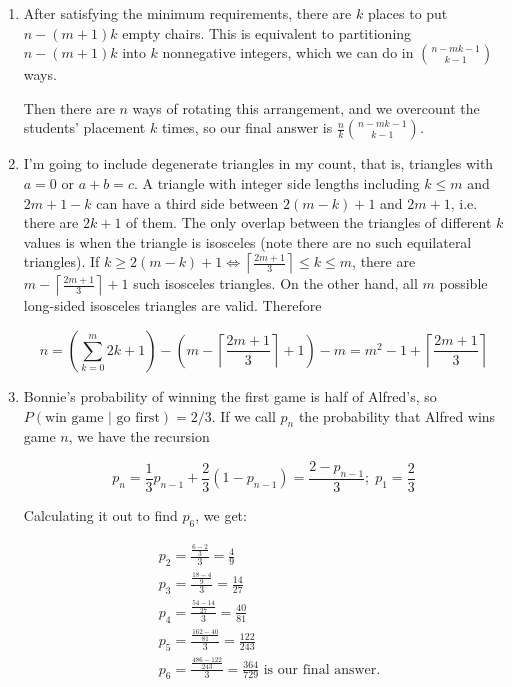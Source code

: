 \documentclass{book}
\numberwithin{equation}{section}
\begin{document}
\begin{enumerate}[label={9.\arabic*}]
\item
After satisfying the minimum requirements, there are $k$ places to put $n-(m+1)k$ empty chairs. This is equivalent
to partitioning $n-(m+1)k$ into $k$ nonnegative integers, which we can do in ${n-mk-1 \choose k-1}$ ways.

Then there are $n$ ways of rotating this arrangement, and we overcount the students' placement $k$ times, so our
final answer is $\frac{n}{k}{n-mk-1 \choose k-1}$.

\item
I'm going to include degenerate triangles in my count, that is, triangles with $a = 0$ or $a+b = c$. A triangle with
integer side lengths including $k \leq m$ and $2m + 1 - k$ can have a third side between $2(m-k) + 1$ and $2m + 1$,
i.e. there are $2k + 1$ of them. The only overlap between the triangles of different $k$ values is when the triangle
is isosceles (note there are no such equilateral triangles).
If $k \geq 2(m-k)+1 \iff \left\lceil\frac{2m + 1}{3}\right\rceil \leq k \leq m$, there are
$m - \left\lceil\frac{2m + 1}{3}\right\rceil + 1$ such isosceles triangles. On the other hand, all $m$ possible long-sided
isosceles triangles are valid.
Therefore

$$n = \left(\sum_{k=0}^m 2k+1\right) - (m - \left\lceil\frac{2m + 1}{3}\right\rceil + 1) - m = m^2 - 1 + \left\lceil\frac{2m + 1}{3}\right\rceil$$

\item
Bonnie's probability of winning the first game is half of Alfred's, so \\
$P(\text{win game }|\text{ go first}) = 2/3$. If we call $p_n$ the probability that Alfred wins game $n$, we have the
recursion

$$p_n = \frac{1}{3}p_{n-1} + \frac{2}{3}(1 - p_{n-1}) = \frac{2 - p_{n-1}}{3}; \; p_1 = \frac{2}{3}$$

Calculating it out to find $p_6$, we get:

\begin{align*}
& p_2 = \frac{\frac{6 - 2}{3}}{3} = \frac{4}{9} \\
& p_3 = \frac{\frac{18 - 4}{9}}{3} = \frac{14}{27} \\
& p_4 = \frac{\frac{54 - 14}{27}}{3} = \frac{40}{81} \\
& p_5 = \frac{\frac{162 - 40}{81}}{3} = \frac{122}{243} \\
& p_6 = \frac{\frac{486 - 122}{243}}{3} = \frac{364}{729} \text{ is our final answer.}
\end{align*}


\end{enumerate}
\end{document}
